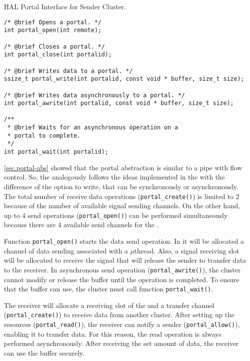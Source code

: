 \begin{listing}[t]
\caption{HAL Portal Interface for Sender Cluster.}
\label{code:portal-sender}
\begin{verbatim}
/* @brief Opens a portal. */
int portal_open(int remote);

/* @brief Closes a portal. */
int portal_close(int portalid);

/* @brief Writes data to a portal. */
ssize_t portal_write(int portalid, const void * buffer, size_t size);

/* @brief Writes data asynchronously to a portal. */
int portal_awrite(int portalid, const void * buffer, size_t size);

/**
 * @brief Waits for an asynchronous operation on a
 * portal to complete.
 */
int portal_wait(int portalid);
\end{verbatim}
\end{listing}

			\autoref{sec.portal-abs} showed that the portal abstraction is similar to
			a \posix pipe with flow control.
			So, the \portal analogously follows the ideas implemented
			in the \mailbox with the difference of the option to write,
			that can be synchronously or asynchronously.
			The total number of receive data operations (\texttt{portal\_create()})
			is limited to 2 because of the number of available signal sending channels.
			On the other hand, up to 4 send operations (\texttt{portal\_open()})
			can be performed simultaneously because there are 4 available send
			channels for the \portal.

			Function \texttt{portal\_open()} starts the data send operation.
			In it will be allocated a channel of data sending associated with
			a $\mu$thread.
			Also, a signal receiving slot will be allocated to receive the
			signal that will release the sender to transfer data to the receiver.
			In asynchronous send operation (\texttt{portal\_awrite()}), the cluster
			cannot modify or release the buffer until the operation is completed.
			To ensure that the buffer can use, the cluster must call function \texttt{portal\_wait()}.

			The receiver will allocate a receiving slot of the \dnoc and a transfer
			channel (\texttt{portal\_create()}) to receive data from another cluster.
			After setting up the resources (\texttt{portal\_read()}), the receiver
			can notify a sender (\texttt{portal\_allow()}), enabling it to transfer data.
			For this reason, the read operation is always performed asynchronously.
			After receiving the set amount of data, the receiver can use the buffer securely.

